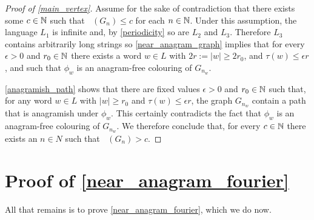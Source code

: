 \documentclass{patmorin}
\DeclareMathOperator{\afcn}{\dot{\chi}_\pi}
\begin{document}
\begin{proof}[Proof of \cref{main_vertex}]
    Assume for the sake of contradiction that there exists some $c\in\mathbb{N}$ such that $\afcn(G_n)\le c$ for each $n\in\mathbb{N}$.  Under this assumption, the language $L_1$ is infinite and, by \cref{periodicity} so are $L_2$ and $L_3$.  Therefore $L_3$ contains arbitrarily long strings so \cref{near_anagram_graph} implies that for every $\epsilon>0$ and $r_0\in\mathbb{N}$ there exists a word $w\in L$ with $2r:=|w|\ge 2r_0$, and $\tau(w)\le\epsilon r$, and such that $\phi_w$ is an anagram-free colouring of $G_{n_w}$.

    \cref{anagramish_path} shows that there are fixed values $\epsilon >0$ and $r_0\in \mathbb{N}$ such that, for any word $w\in L$ with $|w|\ge r_0$ and $\tau(w)\le\epsilon r$, the graph $G_{n_w}$ contain a path that is anagramish under $\phi_w$.  This certainly contradicts the fact that $\phi_w$ is an anagram-free colouring of $G_{n_w}$. We therefore conclude that, for every $c\in\mathbb{N}$ there exists an $n\in N$ such that $\afcn(G_n)> c$.
\end{proof}

%



\section{Proof of \cref{near_anagram_fourier}}
\label{near_anagram_proof}


All that remains is to prove \cref{near_anagram_fourier}, which we do now.
\end{document}
